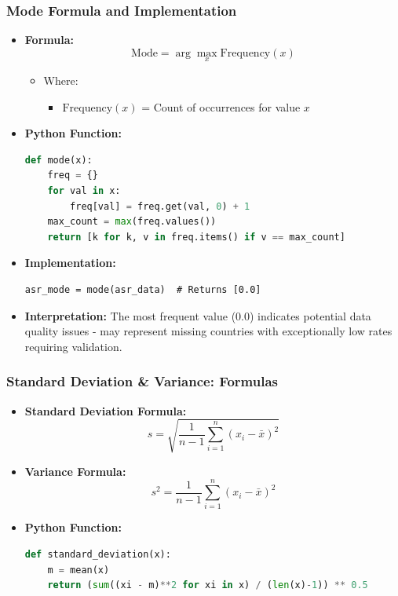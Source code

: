 \begin{frame}[fragile]
    \frametitle{Mode Formula and Implementation}
    \begin{itemize}
        \item \textbf{Formula:}
        \[
        \text{Mode} = \arg\max_{x} \text{Frequency}(x)
        \]
        \begin{itemize}
            \item Where:
            \begin{itemize}
                \item $\text{Frequency}(x)$ = Count of occurrences for value $x$
            \end{itemize}
        \end{itemize}
        
        \item \textbf{Python Function:}
        \begin{lstlisting}[language=Python, breaklines=true]
def mode(x):
    freq = {}
    for val in x:
        freq[val] = freq.get(val, 0) + 1
    max_count = max(freq.values())
    return [k for k, v in freq.items() if v == max_count]
        \end{lstlisting}
        
        \item \textbf{Implementation:}
        \begin{lstlisting}
asr_mode = mode(asr_data)  # Returns [0.0]
        \end{lstlisting}
        
        \item \textbf{Interpretation:} The most frequent value (\SI{0.0}{\perthousand}) indicates potential data quality issues - may represent missing countries with exceptionally low rates requiring validation.
    \end{itemize}
\end{frame}

\begin{frame}[fragile]
    \frametitle{Standard Deviation \& Variance: Formulas}
    \begin{itemize}
        \item \textbf{Standard Deviation Formula:}
        \[
        s = \sqrt{\frac{1}{n-1} \sum_{i=1}^{n} (x_i - \bar{x})^2}
        \]
        
        \item \textbf{Variance Formula:}
        \[
        s^2 = \frac{1}{n-1} \sum_{i=1}^{n} (x_i - \bar{x})^2
        \]
        
        \item \textbf{Python Function:}
        \begin{lstlisting}[language=Python, breaklines=true]
def standard_deviation(x):
    m = mean(x)
    return (sum((xi - m)**2 for xi in x) / (len(x)-1)) ** 0.5
        \end{lstlisting}
    \end{itemize}
\end{frame}

